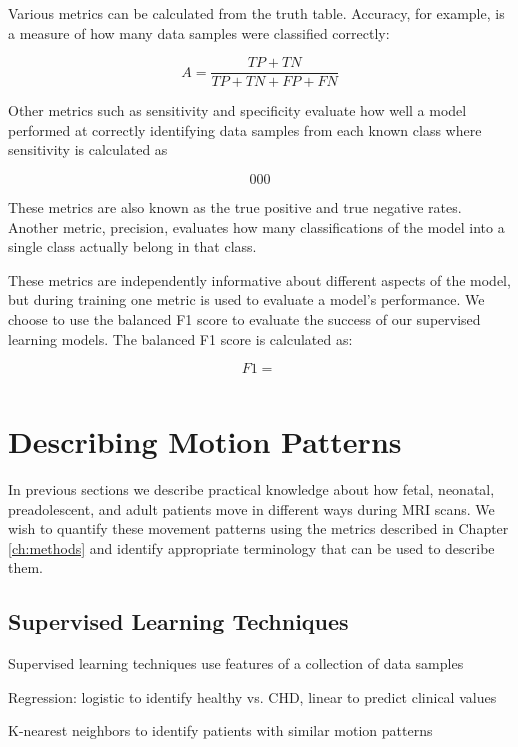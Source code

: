 Various metrics can be calculated from the truth table. Accuracy, for example, is a measure of how many data samples were classified correctly:

\begin{equation}
A = \frac{TP+TN}{TP+TN+FP+FN}
\end{equation}

\noindent Other metrics such as sensitivity and specificity evaluate how well a model performed at correctly identifying data samples from each known class where sensitivity is calculated as

\begin{equation}
000
\end{equation}

These metrics are also known as the true positive and true negative rates. Another metric, precision, evaluates how many classifications of the model into a single class actually belong in that class.

These metrics are independently informative about different aspects of the model, but during training one metric is used to evaluate a model's performance. We choose to use the balanced F1 score to evaluate the success of our supervised learning models. The balanced F1 score is calculated as:

\begin{equation}
F1 = \frac{}{}
\end{equation}

\section{Describing Motion Patterns}

In previous sections we describe practical knowledge about how fetal, neonatal, preadolescent, and adult patients move in different ways during MRI scans. We wish to quantify these movement patterns using the metrics described in Chapter \ref{ch:methods} and identify appropriate terminology that can be used to describe them.


\subsection{Supervised Learning Techniques}

Supervised learning techniques use features of a collection of data samples

Regression: logistic to identify healthy vs. CHD, linear to predict clinical values

K-nearest neighbors to identify patients with similar motion patterns







